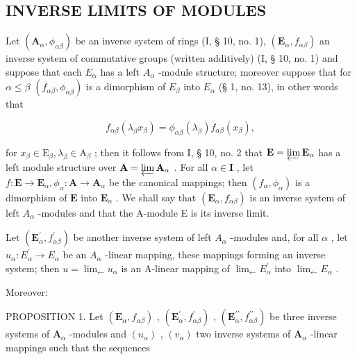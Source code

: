 \subsection{INVERSE LIMITS OF MODULES}

Let \((\mathbf{A}_{\alpha}, \phi_{\alpha\beta})\) be an inverse system of rings (I, § 10, no. 1), \((\mathbf{E}_{\alpha}, f_{\alpha\beta})\) an inverse system of commutative groups (written additively) (I, § 10, no. 1) and suppose that each \(E_{\alpha}\) has a left \(A_{\alpha}\) -module structure; moreover suppose that for \(\alpha \leqslant \beta\) \((f_{\alpha\beta}, \phi_{\alpha\beta})\) is a dimorphism of \(E_{\beta}\) into \(E_{\alpha}\) (§ 1, no. 13), in other words that

\[
f _ {\alpha \beta} (\lambda_ {\beta} x _ {\beta}) = \phi_ {\alpha \beta} (\lambda_ {\beta}) f _ {\alpha \beta} (x _ {\beta}),\tag{1}
\]

for \(x_{\beta} \in \mathrm{E}_{\beta}, \lambda_{\beta} \in \mathrm{A}_{\beta}\) ; then it follows from I, § 10, no. 2 that \(\mathbf{E} = \varprojlim \mathbf{E}_{\alpha}\) has a left module structure over \(\mathbf{A} = \varprojlim \mathbf{A}_{\alpha}\) . For all \(\alpha \in \mathbf{I}\) , let \(f: \mathbf{E} \to \mathbf{E}_{\alpha}, \phi_{\alpha}: \mathbf{A} \to \mathbf{A}_{\alpha}\) be the canonical mappings; then \((f_{\alpha}, \phi_{\alpha})\) is a dimorphism of \(\mathbf{E}\) into \(\mathbf{E}_{\alpha}\) . We shall say that \((\mathbf{E}_{\alpha}, f_{\alpha\beta})\) is an inverse system of left \(A_{\alpha}\) -modules and that the A-module E is its inverse limit.

Let \((\mathbf{E}_{\alpha}^{\prime}, f_{\alpha\beta}^{\prime})\) be another inverse system of left \(A_{\alpha}\) -modules and, for all \(\alpha\) , let \(u_{\alpha}: E_{\alpha}^{\prime} \to E_{\alpha}\) be an \(A_{\alpha}\) -linear mapping, these mappings forming an inverse system; then \(u = \lim_{\leftarrow} u_{\alpha}\) is an A-linear mapping of \(\lim_{\leftarrow} E_{\alpha}^{\prime}\) into \(\lim_{\leftarrow} E_{\alpha}\) .

Moreover:

PROPOSITION 1. Let \((\mathbf{E}_{\alpha}, f_{\alpha\beta})\) , \((\mathbf{E}_{\alpha}^{\prime}, f_{\alpha\beta}^{\prime})\) , \((\mathbf{E}_{\alpha}^{\prime \prime}, f_{\alpha\beta}^{\prime \prime})\) be three inverse systems of \(\mathbf{A}_{\alpha}\) -modules and \((u_{\alpha})\) , \((v_{\alpha})\) two inverse systems of \(\mathbf{A}_{\alpha}\) -linear mappings such that the sequences

